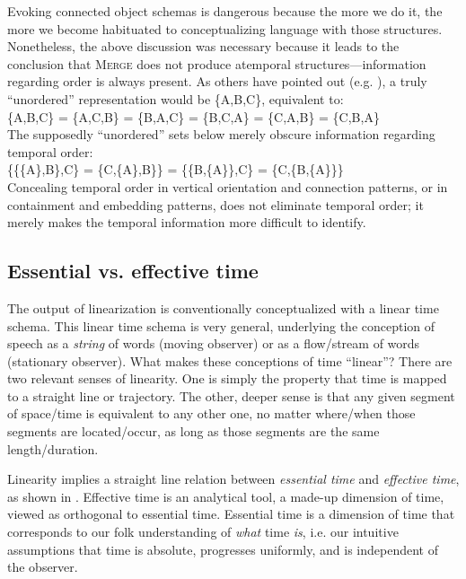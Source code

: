   Evoking connected object schemas is dangerous because the more we do it, the more we become habituated to conceptualizing language with those structures. Nonetheless, the above discussion was necessary because it leads to the conclusion that \textsc{Merge} does not produce atemporal structures—information regarding order is always present. As others have pointed out (e.g. \citealt{Yang1999}), a truly “unordered” representation would be \{A,B,C\}, equivalent to:\\

  \{A,B,C\} = \{A,C,B\} = \{B,A,C\} = \{B,C,A\} = \{C,A,B\} = \{C,B,A\}\\

The supposedly “unordered” sets below merely obscure information regarding temporal order:\\

  \{\{\{A\},B\},C\} = \{C,\{A\},B\}\} = \{\{B,\{A\}\},C\} = \{C,\{B,\{A\}\}\}\\

 Concealing temporal order in vertical orientation and connection patterns, or in containment and embedding patterns, does not eliminate temporal order; it merely makes the temporal information more difficult to identify. 

\subsection{Essential vs. effective time}

The output of linearization is conventionally conceptualized with a linear time schema. This linear time schema is very general, underlying the conception of speech as a \textit{string} of words (moving observer) or as a flow/stream of words (stationary observer). What makes these conceptions of time “linear”?  There are two relevant senses of linearity. One is simply the property that time is mapped to a straight line or trajectory. The other, deeper sense is that any given segment of space/time is equivalent to any other one, no matter where/when those segments are located/occur, as long as those segments are the same length/duration. 

  Linearity implies a straight line relation between \textit{essential time} and \textit{effective time}, as shown in {}. Effective time is an analytical tool, a made-up dimension of time, viewed as orthogonal to essential time. Essential time is a dimension of time that corresponds to our folk understanding of \textit{what} time \textit{is}, i.e. our intuitive assumptions that time is absolute, progresses uniformly, and is independent of the observer.


